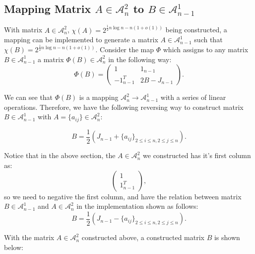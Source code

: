 \documentclass[11pt]{article}
\begin{document}
\subsection{Mapping Matrix $A \in \mathcal{A}_n^2$ to $B \in \mathcal{A}_{n - 1}^1$}
With matrix $A \in \mathcal{A}_n^2$, $\chi(A)=2^{\frac{1}{2}n\log n-n(1+o(1))}$ being constructed, a mapping can be implemented to generate a matrix $A \in \mathcal{A}_{n-1}^{1}$ such that $\chi(B)=2^{\frac{1}{2}n\log n-n(1+o(1))}$. Consider the map $\Phi$ which assigns to any matrix $B \in \mathcal{A}_{n - 1}^1$ a matrix $\Phi(B) \in \mathcal{A}_{n}^2$ in the following way:
$$ \Phi(B) = \left(\begin{array}{cc} 
1 & 1_{n-1}\\
-1^T_{n-1} & 2B-J_{n-1}
\end{array}\right).
$$

We can see that $\Phi(B)$ is a mapping $\mathcal{A}_n^2 \to \mathcal{A}_{n - 1}^1$ with a series of linear operations. Therefore, we have the following reversing way to construct matrix $B \in \mathcal{A}_{n - 1}^1$ with $A=\{a_{ij}\}\in \mathcal{A}_n^2$:

$$B = \frac{1}{2}(J_{n-1}+\{a_{ij}\}_{2\le i\le n, 2\le j\le n}).$$

Notice that in the above section, the $A \in \mathcal{A}_n^2$ we constructed has it's first column as:
$$ \left(\begin{array}{cc} 
1\\
1^T_{n-1}
\end{array}\right),
$$
so we need to negative the first column, and have the relation between matrix $B \in \mathcal{A}_{n - 1}^1$ and $A \in \mathcal{A}_n^2$ in the implementation shown as follows:    
$$B = \frac{1}{2}(J_{n-1}-\{a_{ij}\}_{2\le i\le n, 2\le j\le n}).$$

With the matrix $A \in \mathcal{A}_n^2$ constructed above, a constructed matrix $B$ is shown below:
\end{document}
